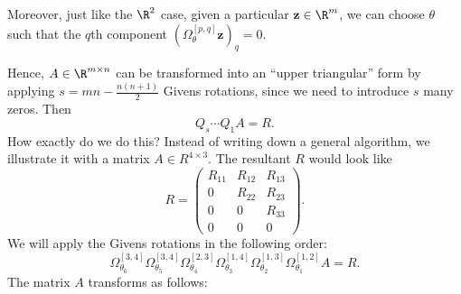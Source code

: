 \documentclass[a4paper]{article}
\begin{document}
Moreover, just like the $\R^2$ case, given a particular $\mathbf{z} \in \R^m$, we can choose $\theta$ such that the $q$th component $(\Omega^{[p, q]}_\theta \mathbf{z})_q = 0$.

Hence, $A \in \R^{m \times n}$ can be transformed into an ``upper triangular'' form by applying $s = mn - \frac{n(n + 1)}{2}$ Givens rotations, since we need to introduce $s$ many zeros. Then
\[
  Q_s \cdots Q_1 A = R.
\]
How exactly do we do this? Instead of writing down a general algorithm, we illustrate it with a matrix $A \in R^{4 \times 3}$. The resultant $R$ would look like
\[
  R =
  \begin{pmatrix}
    R_{11} & R_{12} & R_{13}\\
    0 & R_{22} & R_{23}\\
    0 & 0 & R_{33}\\
    0 & 0 & 0
  \end{pmatrix}.
\]
We will apply the Givens rotations in the following order:
\[
  \Omega_{\theta_6}^{[3, 4]}\Omega_{\theta_5}^{[3, 4]} \Omega_{\theta_4}^{[2, 3]} \Omega_{\theta_3}^{[1, 4]} \Omega_{\theta_2}^{[1, 3]} \Omega_{\theta_1}^{[1, 2]} A = R.
\]
The matrix $A$ transforms as follows:
\end{document}
